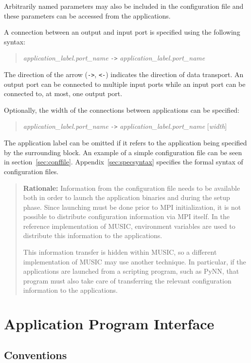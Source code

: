 \documentclass[a4paper,twoside]{report}
\newenvironment{rationale}%
{\par\begin{quote}\textbf{Rationale:}}%
{\par\end{quote}}
\begin{document}
Arbitrarily named parameters may also be included in the configuration
file and these parameters can be accessed from the applications.

A connection between an output and input port is specified using the
following syntax:
\begin{quote}
  \emph{application\_label.port\_name} \lstinline|->| \emph{application\_label.port\_name}
\end{quote}
\noindent  The direction of the arrow (\lstinline|->|, \lstinline|<-|) indicates the
direction of data transport.  An output port can be connected to
multiple input ports while an input port can be connected to, at most,
one output port.

Optionally, the width of the connections between applications can be
specified:
\begin{quote}
  \emph{application\_label.port\_name} \lstinline|->|
  \emph{application\_label.port\_name} [\emph{width}]
\end{quote}
The application label can be omitted if it refers to the application
being specified by the surrounding block.
An example of a simple configuration file can be seen in
section~\ref{sec:conffile}.  Appendix~\ref{sec:specsyntax} specifies
the formal syntax of configuration files.

\begin{rationale}
  Information from the configuration file needs to be available both
  in order to launch the application binaries and during the setup
  phase.  Since launching must be done prior to MPI initialization, it
  is not possible to distribute configuration information via MPI
  itself.  In the reference implementation of MUSIC, environment
  variables are used to distribute this information to the
  applications.

  This information transfer is hidden within MUSIC, so a different
  implementation of MUSIC may use another technique.  In particular,
  if the applications are launched from a scripting program, such as
  PyNN, that program must also take care of transferring
  the relevant configuration information to the applications.
\end{rationale}


\chapter{Application Program Interface}

\section{Conventions}
\end{document}
